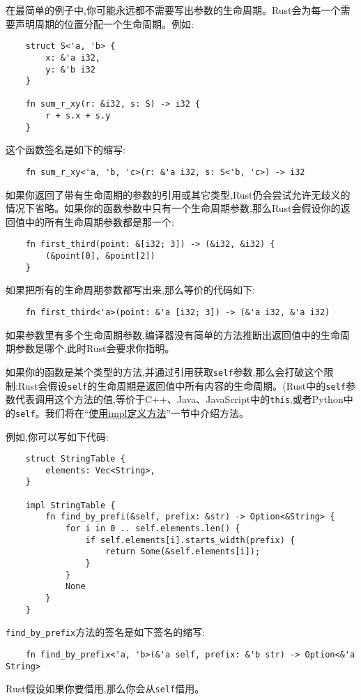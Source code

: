 在最简单的例子中,你可能永远都不需要写出参数的生命周期。Rust会为每一个需要声明周期的位置分配一个生命周期。例如:
\begin{verbatim}
    struct S<'a, 'b> {
        x: &'a i32,
        y: &'b i32
    }

    fn sum_r_xy(r: &i32, s: S) -> i32 {
        r + s.x + s.y
    }
\end{verbatim}

这个函数签名是如下的缩写:
\begin{verbatim}
    fn sum_r_xy<'a, 'b, 'c>(r: &'a i32, s: S<'b, 'c>) -> i32
\end{verbatim}

如果你返回了带有生命周期的参数的引用或其它类型,Rust仍会尝试允许无歧义的情况下省略。如果你的函数参数中只有一个生命周期参数,那么Rust会假设你的返回值中的所有生命周期参数都是那一个:
\begin{verbatim}
    fn first_third(point: &[i32; 3]) -> (&i32, &i32) {
        (&point[0], &point[2])
    }
\end{verbatim}

如果把所有的生命周期参数都写出来,那么等价的代码如下:
\begin{verbatim}
    fn first_third<'a>(point: &'a [i32; 3]) -> (&'a i32, &'a i32)
\end{verbatim}

如果参数里有多个生命周期参数,编译器没有简单的方法推断出返回值中的生命周期参数是哪个,此时Rust会要求你指明。

如果你的函数是某个类型的方法,并通过引用获取\texttt{self}参数,那么会打破这个限制:Rust会假设\texttt{self}的生命周期是返回值中所有内容的生命周期。(Rust中的\texttt{self}参数代表调用这个方法的值,等价于C++、Java、JavaScript中的\texttt{this},或者Python中的\texttt{self}。我们将在“\hyperref[method]{使用impl定义方法}”一节中介绍方法。

例如,你可以写如下代码:
\begin{verbatim}
    struct StringTable {
        elements: Vec<String>,
    }

    impl StringTable {
        fn find_by_prefi(&self, prefix: &str) -> Option<&String> {
            for i in 0 .. self.elements.len() {
                if self.elements[i].starts_width(prefix) {
                    return Some(&self.elements[i]);
                }
            }
            None
        }
    }
\end{verbatim}

\texttt{find\_by\_prefix}方法的签名是如下签名的缩写:
\begin{verbatim}
    fn find_by_prefix<'a, 'b>(&'a self, prefix: &'b str) -> Option<&'a String>
\end{verbatim}
Rust假设如果你要借用,那么你会从\texttt{self}借用。

